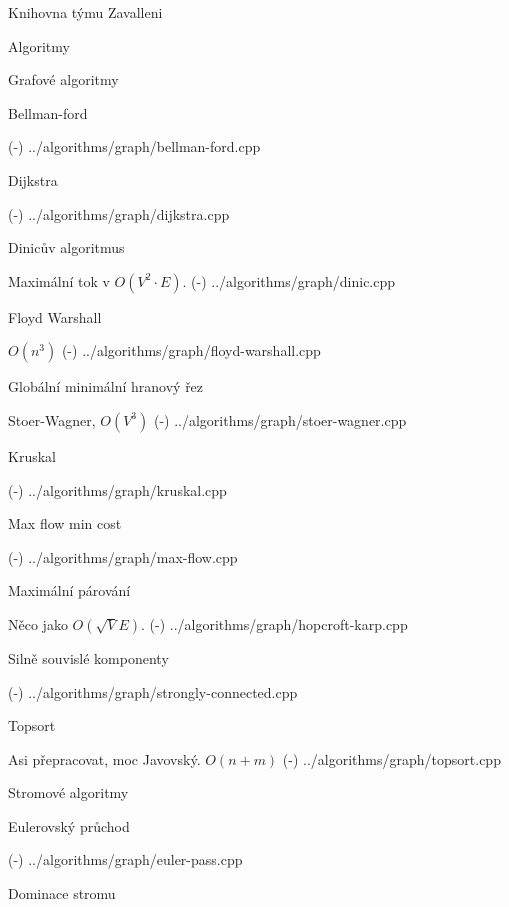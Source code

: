 
\chyph

\hyperlinks{\Blue}{\Green} %

\def\newpage{\vfil \break} %
\def\linebreak{\hfil \break} %
\overfullrule=0pt %
\def\tthook{\ttline=-2} %

\tit Knihovna týmu Zavalleni

\maketoc

\chap Algoritmy

\sec Grafové algoritmy 

\secc Bellman-ford 

\verbinput (-) ../algorithms/graph/bellman-ford.cpp

\secc Dijkstra 

\verbinput (-) ../algorithms/graph/dijkstra.cpp

\secc Dinicův algoritmus 

Maximální tok v $O(V^2 \cdot E)$.
\verbinput (-) ../algorithms/graph/dinic.cpp

\secc Floyd Warshall 

$O(n^3)$
\verbinput (-) ../algorithms/graph/floyd-warshall.cpp

\secc Globální minimální hranový řez 

Stoer-Wagner, $O(V^3)$
\verbinput (-) ../algorithms/graph/stoer-wagner.cpp

\secc Kruskal 

\verbinput (-) ../algorithms/graph/kruskal.cpp

\secc Max flow min cost

\verbinput (-) ../algorithms/graph/max-flow.cpp

\secc Maximální párování 

Něco jako $O(\sqrt{V}E)$.
\verbinput (-) ../algorithms/graph/hopcroft-karp.cpp

\secc Silně souvislé komponenty

\verbinput (-) ../algorithms/graph/strongly-connected.cpp

\secc Topsort 

Asi přepracovat, moc Javovský. $O(n + m)$
\verbinput (-) ../algorithms/graph/topsort.cpp

\sec Stromové algoritmy 

\secc Eulerovský průchod

\verbinput (-) ../algorithms/graph/euler-pass.cpp

\secc Dominace stromu 

